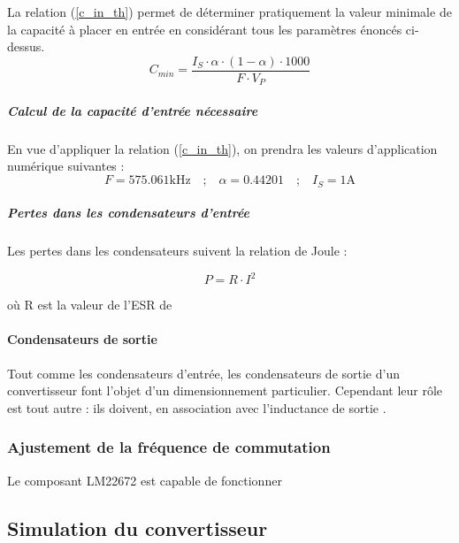 \documentclass[a4paper,12pt]{report}
\begin{document}
						La relation (\ref{c_in_th}) permet de déterminer pratiquement la valeur minimale de la capacité à placer en entrée en considérant tous les paramètres énoncés ci-dessus.
						\begin{equation}
							C_{min} = \frac{I_S\cdot\alpha\cdot(1-\alpha)\cdot 1000}{F\cdot V_P}
							\label{c_in_th}
						\end{equation}
						
						\subparagraph{Calcul de la capacité d'entrée nécessaire}
						
						En vue d'appliquer la relation (\ref{c_in_th}), on prendra les valeurs d'application numérique suivantes :		
						\begin{equation}
							F = 575.061\text{kHz} 
							\quad\text{;}\quad
							\alpha = 0.44201
							\quad\text{;}\quad
							I_S = 1\text{A}
						\end{equation}
						
						\subparagraph{Pertes dans les condensateurs d'entrée}
						
						Les pertes dans les condensateurs suivent la relation de Joule :
						
						\begin{equation}
							P = R \cdot I^2
						\end{equation}
						
						où R est la valeur de l'ESR de
						
								
							\paragraph{Condensateurs de sortie}
							
							Tout comme les condensateurs d'entrée, les condensateurs de sortie d'un convertisseur font l'objet d'un dimensionnement particulier. Cependant leur rôle est tout autre : ils doivent, en association avec l'inductance de sortie \cite{A055}.	
				
				
			
			\subsubsection{Ajustement de la fréquence de commutation}
			
			Le composant LM22672 est capable de fonctionner 
			
			\subsection{Simulation du convertisseur}
			
\end{document}
